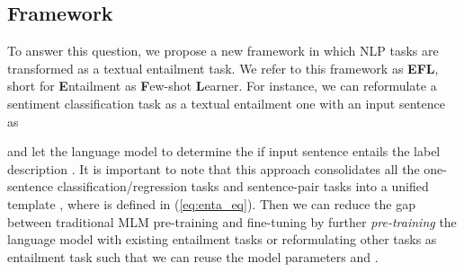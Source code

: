 \documentclass{article}
\begin{document}
\subsection{Framework}

To answer this question, we propose a new framework in which  NLP tasks are transformed as a textual entailment task. We refer to this framework as \textbf{EFL}, short for \textbf{E}ntailment as \textbf{F}ew-shot \textbf{L}earner. For instance, we can reformulate a sentiment classification task as a textual entailment one with an input sentence  as

and let the language model  to determine the if input sentence  entails the label description . It is important to note that this approach consolidates all the one-sentence classification/regression tasks and sentence-pair tasks into a unified template , where  is defined in (\ref{eq:enta_eq}). Then we can reduce the gap between traditional MLM pre-training and fine-tuning by further \textit{pre-training} the language model with existing entailment tasks or reformulating other tasks as entailment task such that we can reuse the model parameters  and .

\begin{table*}[t]
\centering
{}
\caption{The impact of label descriptions on our proposed EFL method with . The performance is relative stable if the designed label descriptions are close to the problem definition, but degenerates if choosing semantic-unrelated label descriptions.}
\label{table:label_ablation}
\end{table*}
\end{document}
